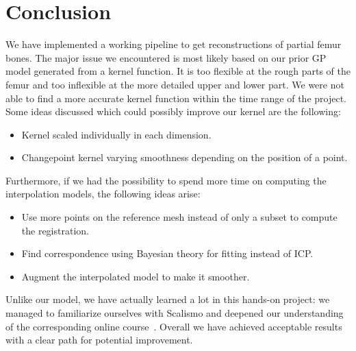 \section{Conclusion}
\label{sec:conclusion}

We have implemented a working pipeline to get reconstructions of partial femur bones.
The major issue we encountered is most likely based on our prior GP model generated from a kernel function.
It is too flexible at the rough parts of the femur and too inflexible at the more detailed upper and lower part.
We were not able to find a more accurate kernel function within the time range of the project.
Some ideas discussed which could possibly improve our kernel are the following:
\begin{itemize}
  \item Kernel scaled individually in each dimension.
  \item Changepoint kernel varying smoothness depending on the position of a point.
\end{itemize}

Furthermore, if we had the possibility to spend more time on computing the interpolation models, the following ideas arise:
\begin{itemize}
  \item Use more points on the reference mesh instead of only a subset to compute the registration.
  \item Find correspondence using Bayesian theory for fitting instead of ICP.
  \item Augment the interpolated model to make it smoother.
\end{itemize}

Unlike our model, we have actually learned a lot in this hands-on project: we managed to familiarize ourselves with Scalismo and deepened our understanding of the corresponding online course~\cite{mooc2019statistical}.
Overall we have achieved acceptable results with a clear path for potential improvement.